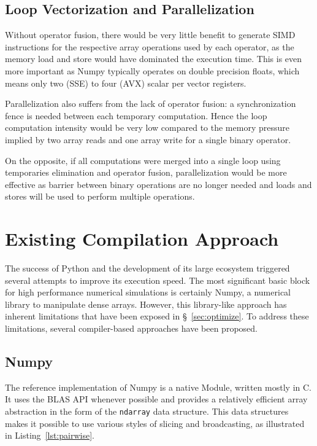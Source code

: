\documentclass[10pt, preprint]{sigplanconf}
\begin{document}
\subsection{Loop Vectorization and Parallelization}

Without operator fusion, there would be very little benefit to generate SIMD
instructions for the respective array operations used by each operator, as the
memory load and store would have dominated the execution time. This is even more important as
Numpy typically operates on double precision floats, which means only two (SSE)
to four (AVX) scalar per vector registers.

Parallelization also suffers from the lack of operator fusion: a
synchronization fence is needed between each temporary computation.  Hence the
loop computation intensity would be very low compared to the memory pressure
implied by two array reads and one array write for a single binary operator.

On the opposite, if all computations were merged into a single loop using
temporaries elimination and operator fusion, parallelization would be more
effective as barrier between binary operations are no longer needed and loads
and stores will be used to perform multiple operations.

\section{Existing Compilation Approach}
\label{sec:compilers}

The success of Python and the development of its large ecosystem triggered
several attempts to improve its execution speed. The most significant basic
block for high performance numerical simulations is certainly Numpy, a
numerical library to manipulate dense arrays. However, this library-like
approach has inherent limitations that have been exposed in \S~\ref{sec:optimize}.
To address these limitations, several compiler-based approaches have been proposed.

\subsection{Numpy}

The reference implementation of Numpy is a native Module, written mostly in C.
It uses the BLAS API whenever possible and provides a relatively efficient array
abstraction in the form of the \texttt{ndarray} data structure. This data
structures makes it possible to use various styles of slicing and broadcasting,
as illustrated in Listing~\ref{lst:pairwise}.
\end{document}
